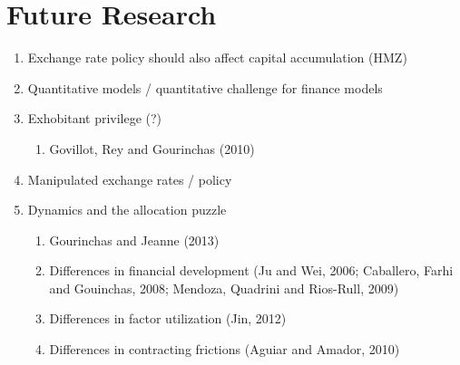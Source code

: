 \documentclass[12pt,letter]{article}
\theoremstyle{break} \theorembodyfont{\normalfont\itshape}
\theoremstyle{break}
\theoremstyle{break} \theorembodyfont{\normalfont\itshape}
\theoremstyle{break} \theorembodyfont{\normalfont\itshape}
\begin{document}
\section{Future Research}
\begin{enumerate}
    \item Exchange rate policy should also affect capital accumulation (HMZ)
    \item Quantitative models / quantitative challenge for finance models

    \item Exhobitant privilege (?)
    \begin{enumerate}
        \item Govillot, Rey and Gourinchas (2010)
    \end{enumerate}
    \item Manipulated exchange rates / policy
    \item Dynamics and the allocation puzzle 
    \begin{enumerate}
        \item Gourinchas and Jeanne (2013)
        \item  Differences in financial development (Ju and Wei, 2006; Caballero, Farhi and Gouinchas, 2008; Mendoza, Quadrini and Rios-Rull, 2009)
        \item Differences in factor utilization (Jin, 2012)
        \item Differences in contracting frictions (Aguiar and Amador, 2010)
    \end{enumerate}
\end{enumerate}
\end{document}
